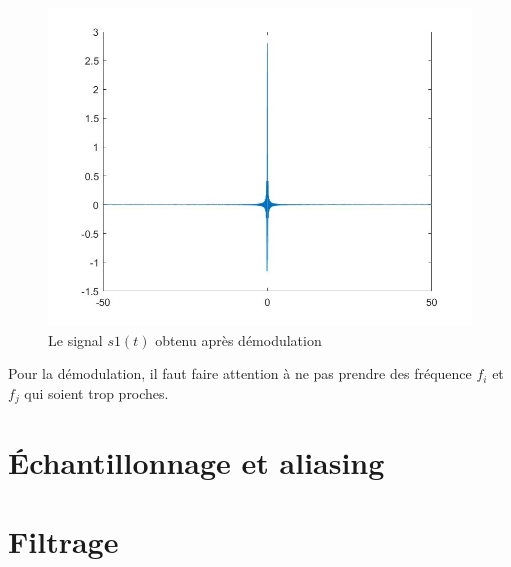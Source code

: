 \documentclass[10pt,a4paper]{article}
\begin{document}
\begin{figure}	\begin{center}
\includegraphics[scale=0.35]{s1_demodule.jpg}
\caption{Le signal $s1(t)$  obtenu après démodulation}
\label{s1demod}
\end{center}	\end{figure}



Pour la démodulation, il faut faire attention à ne pas prendre des fréquence $f_i$ et $f_j$ qui soient trop proches.




\newpage

\section{Échantillonnage et aliasing	}

\section{Filtrage}
\end{document}
